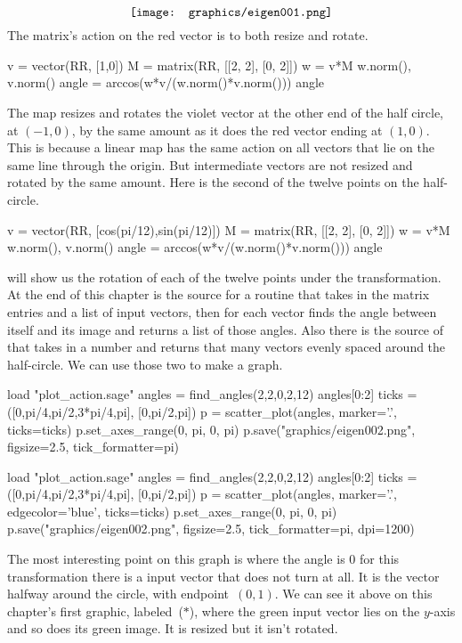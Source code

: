 \begin{equation*}
  \vcenteredhbox{\texttt{[image: graphics/eigen001.png]}}
\end{equation*}
The matrix's action on the red vector is to both resize and rotate.
\begin{sageoutput}
v = vector(RR, [1,0])
M = matrix(RR, [[2, 2], [0, 2]])
w = v*M
w.norm(), v.norm() 
angle = arccos(w*v/(w.norm()*v.norm())) 
angle 
\end{sageoutput}
\noindent The map resizes and rotates the violet vector at the other end of the 
half circle, at $(-1,0)$, by the
same amount as it does the red vector ending at $(1,0)$. 
This is because a linear map has the same action on 
all vectors that lie on the same line through the origin.
But intermediate vectors are not resized and rotated by the same
amount.
Here is the second of the twelve points on the half-circle.
\begin{sageoutput}
v = vector(RR, [cos(pi/12),sin(pi/12)])
M = matrix(RR, [[2, 2], [0, 2]])
w = v*M
w.norm(), v.norm() 
angle = arccos(w*v/(w.norm()*v.norm())) 
angle 
\end{sageoutput}

\Sage{} will show us the rotation of each of the twelve points 
under the transformation.
At the end of this chapter is the source for a routine 
that takes in the matrix entries and a list of input vectors, then
for each vector finds the angle between itself and its image and
returns a list of those angles.
Also there is the source of  that takes in a
number and returns that many vectors evenly spaced around the half-circle. 
We can use those two to make a graph.
\begin{sageoutput}[d,0,1]
load "plot_action.sage"  
angles = find_angles(2,2,0,2,12)
angles[0:2]
ticks = ([0,pi/4,pi/2,3*pi/4,pi], [0,pi/2,pi])
p = scatter_plot(angles, marker='.', ticks=ticks)
p.set_axes_range(0, pi, 0, pi) 
p.save("graphics/eigen002.png", figsize=2.5, tick_formatter=pi)
\end{sageoutput}
\begin{sagesilent}
load "plot_action.sage"  
angles = find_angles(2,2,0,2,12)
angles[0:2]
ticks = ([0,pi/4,pi/2,3*pi/4,pi], [0,pi/2,pi])
p = scatter_plot(angles, marker='.', edgecolor='blue', ticks=ticks)
p.set_axes_range(0, pi, 0, pi) 
p.save("graphics/eigen002.png", figsize=2.5, tick_formatter=pi, dpi=1200)
\end{sagesilent}
\begin{center}
\end{center}
The most interesting point on this graph is where the angle is $0$\Dash
for this transformation there is a input vector that does not turn at all.
It is the vector halfway around the circle, with endpoint~$(0,1)$. 
We can see it above on this chapter's first graphic, labeled~($*$), 
where the green input vector lies on the $y$-axis and so does its green image.
It is resized but it isn't rotated.




